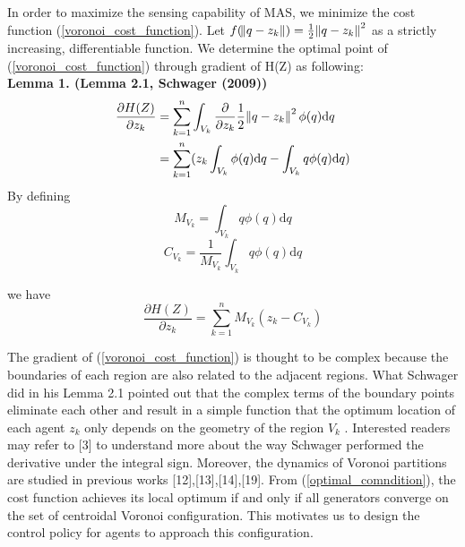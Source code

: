 \noindent In order to maximize the sensing capability of MAS, we minimize the cost function (\ref{voronoi_cost_function}). Let ${f(\norm{q - {z_{k}}}) = \frac{1}{2}\norm{q-z_k}^2}$ as a strictly increasing, differentiable function. We determine the optimal point of (\ref{voronoi_cost_function}) through gradient of H(Z) as following: \\
\textbf{Lemma 1. (Lemma 2.1, Schwager (2009))} \\ 
\begin{equation} \notag
\begin{split}
\frac{\partial H(Z)}{\partial {z_k}} &  = \displaystyle\sum_{k=1}^{n} \int_{V_{k}} \frac{\partial }{\partial {z_{k}}}  \frac{1}{2}\norm{q - {z_{k}}}^2 \phi(q) \mathrm{d}q \\
& = \displaystyle\sum_{k=1}^{n} (z_{k} \int_{V_{k}} \phi(q) \mathrm{d}q - \int_{V_{k}} q \phi(q) \mathrm{d}q) \\   
\end{split}
\end{equation}
\noindent By defining  
\[M_{V_{k}} = \int_{V_{k}} q \phi(q) \mathrm{d}q\] 
\[C_{V_{k}} = \frac{1}{M_{V_{k}}} \int_{V_{k}} q \phi(q) \mathrm{d}q\]

\noindent we have 
\begin{equation} \label{optimal_comndition}
\frac{\partial H(Z)}{\partial {z_k}} = \displaystyle\sum_{k=1}^{n} M_{V_{k}}(z_{k} - C_{V_{k}})
\end{equation}

\noindent The gradient of (\ref{voronoi_cost_function}) is thought to be complex because the boundaries of each region are also related to the adjacent regions. What Schwager did in his Lemma 2.1 pointed out that the complex terms of the boundary points eliminate each other and result in a simple function that the optimum location of each agent $z_k$ only depends on the geometry of the region ${V_k}$ . Interested readers may refer to [3] to understand more about the way Schwager performed the derivative under the integral sign. Moreover, the dynamics of Voronoi partitions are studied in previous works [12],[13],[14],[19].
\noindent From (\ref{optimal_comndition}), the cost function achieves its local optimum if and only if all generators converge on the set of centroidal Voronoi configuration. This motivates us to design the control policy for agents to approach this configuration.

